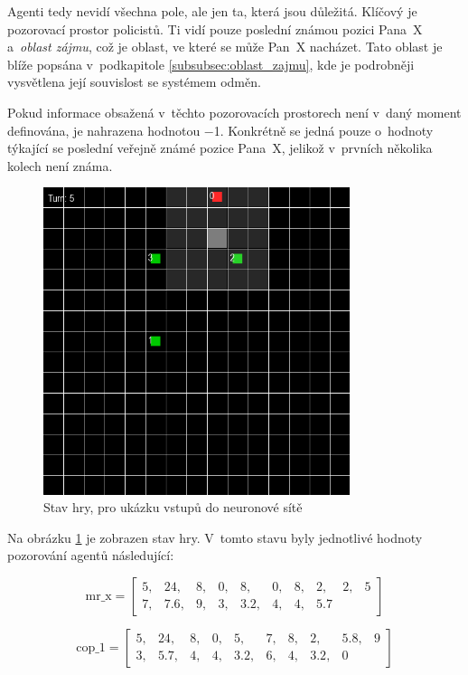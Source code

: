 Agenti tedy nevidí všechna pole, ale jen ta, která jsou důležitá.
Klíčový je pozorovací prostor policistů.
Ti vidí pouze poslední známou pozici Pana~X a~\emph{oblast zájmu}, což je oblast, ve které se může Pan~X nacházet.
Tato oblast je blíže popsána v~podkapitole  \ref{subsubsec:oblast_zajmu}, kde je podrobněji vysvětlena její souvislost se systémem odměn.

Pokud informace obsažená v~těchto pozorovacích prostorech není v~daný moment definována, je nahrazena hodnotou $\minus$1.
Konkrétně se jedná pouze o~hodnoty týkající se poslední veřejně známé pozice Pana~X, jelikož v~prvních několika kolech není známa.

\begin{figure}[H]
	\centering
	\includegraphics[width=0.8\textwidth]{obrazky-figures/game_inputs}
      \caption{Stav hry, pro ukázku vstupů do neuronové sítě}
    \label{fig:game_input}
\end{figure}
Na obrázku \ref{fig:game_input} je zobrazen stav hry.
V~tomto stavu byly jednotlivé hodnoty pozorování agentů následující:

\[
\text{mr\_x} = \begin{bmatrix}
5, & 24, & 8, & 0, & 8, & 0, & 8, & 2, & 2, & 5 \\
7, & 7.6, & 9, & 3, & 3.2, & 4, & 4, & 5.7
\end{bmatrix}
\]

\[
\text{cop\_1} = \begin{bmatrix}
5, & 24, & 8, & 0, & 5, & 7, & 8, & 2, & 5.8, & 9 \\
3, & 5.7, & 4, & 4, & 3.2, & 6, & 4, & 3.2, & 0
\end{bmatrix}
\]

